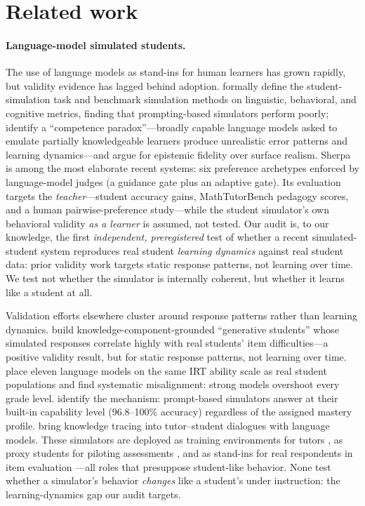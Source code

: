 \documentclass[notitlepage,12pt]{jedm}
\begin{document}
\section{Related work}
\label{sec:related}

\paragraph{Language-model simulated students.} The use of language models as
stand-ins for human learners has grown rapidly, but validity evidence has
lagged behind adoption. \citet{scarlatos2026} formally define the
student-simulation task and benchmark simulation methods on linguistic,
behavioral, and cognitive metrics, finding that prompting-based simulators
perform poorly; \citet{yuan2026} identify a ``competence paradox''---broadly
capable language models asked to emulate partially knowledgeable learners
produce unrealistic error patterns and learning dynamics---and argue for
epistemic fidelity over surface realism. Sherpa \citep{xu2026sherpa} is
among the most elaborate recent systems: six preference archetypes enforced
by language-model judges (a guidance gate plus an adaptive gate). Its
evaluation targets the \emph{teacher}---student accuracy gains,
MathTutorBench pedagogy scores, and a human pairwise-preference study---while
the student simulator's own behavioral validity \emph{as a learner} is
assumed, not tested. Our audit is, to our knowledge, the first
\emph{independent, preregistered} test of whether a recent
simulated-student system reproduces real student \emph{learning dynamics}
against real student data: prior validity work targets static response
patterns, not learning over time. We test not whether the
simulator is internally coherent, but whether it learns like a student at
all.

Validation efforts elsewhere cluster around response patterns rather than
learning dynamics. \citet{lu2024} build knowledge-component-grounded
``generative students'' whose simulated responses correlate highly with real
students' item difficulties---a positive validity result, but for static
response patterns, not learning over time. \citet{srivatsa2025} place eleven
language models on the same IRT ability scale as real student populations
and find systematic misalignment: strong models overshoot every grade level.
\citet{an2026} identify the mechanism: prompt-based simulators answer at
their built-in capability level (96.8--100\% accuracy) regardless of the
assigned mastery profile. \citet{scarlatos2025} bring knowledge tracing into
tutor--student dialogues with language models. These simulators are deployed
as training environments for tutors \citep{xu2026sherpa}, as proxy students
for piloting assessments \citep{srivatsa2025}, and as stand-ins for real
respondents in item evaluation \citep{lu2024}---all roles that presuppose
student-like behavior. None test whether a simulator's behavior
\emph{changes} like a student's under instruction: the learning-dynamics gap
our audit targets.
\end{document}
